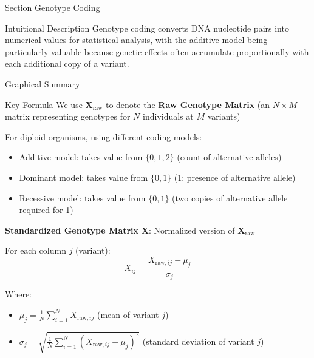 
\begin{frame}{Section}
\centering
\Huge{Genotype Coding}
\end{frame}


\begin{frame}{Intuitional Description}
Genotype coding converts DNA nucleotide pairs into numerical values for statistical analysis, with the additive model being particularly valuable because genetic effects often accumulate proportionally with each additional copy of a variant.

\end{frame}

\begin{frame}{Graphical Summary}

\end{frame}


\begin{frame}{Key Formula}
We use $\mathbf{X}_\text{raw}$ to denote the \textbf{Raw Genotype Matrix} (an $N \times M$ matrix representing genotypes for $N$ individuals at $M$ variants)
   
For diploid organisms, using different coding models:
\begin{itemize}
\item Additive model: takes value from $\{0, 1, 2\}$ (count of alternative alleles)
\item Dominant model: takes value from $\{0, 1\}$ (1: presence of alternative allele)
\item Recessive model: takes value from $\{0, 1\}$ (two copies of alternative allele required for 1)
\end{itemize}

\textbf{Standardized Genotype Matrix} $\mathbf{X}$: Normalized version of $\mathbf{X}_\text{raw}$

For each column $j$ (variant):
   $$X_{ij} = \frac{X_{\text{raw},ij} - \mu_j}{\sigma_j}$$
   
   Where:
\begin{itemize}
\item $\mu_j = \frac{1}{N}\sum_{i=1}^{N} X_{\text{raw},ij}$ (mean of variant $j$)
\item $\sigma_j = \sqrt{\frac{1}{N}\sum_{i=1}^{N} (X_{\text{raw},ij} - \mu_j)^2}$ (standard deviation of variant $j$)
\end{itemize}
\end{frame}



